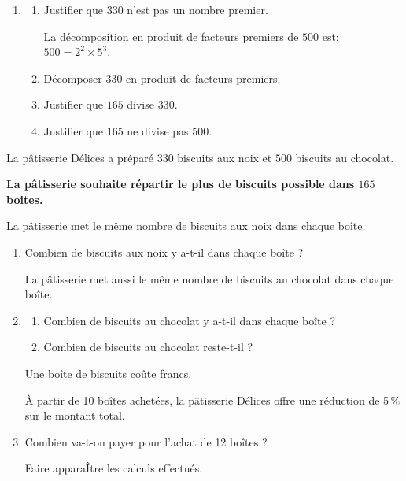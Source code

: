 
\medskip

\begin{enumerate}
\item 
	\begin{enumerate}
		\item Justifier que $330$ n'est pas un nombre premier.
		
La décomposition en produit de facteurs premiers de $500$ est: $500 = 2^2 \times 5^3$.
		\item Décomposer $330$ en produit de facteurs premiers.
		\item Justifier que $165$ divise $330$.
		\item Justifier que 165 ne divise pas $500$.
	\end{enumerate}
\end{enumerate}
	
La pâtisserie Délices a préparé $330$ biscuits aux noix et $500$ biscuits au chocolat.

\textbf{La pâtisserie souhaite répartir le plus de biscuits possible dans $165$ boites.}

La pâtisserie met le même nombre de biscuits aux noix dans chaque boîte.

\begin{enumerate}[resume]
\item Combien de biscuits aux noix y a-t-il dans chaque boîte ?

La pâtisserie met aussi le même nombre de biscuits au chocolat dans chaque boîte.
\item
	\begin{enumerate}
		\item Combien de biscuits au chocolat y a-t-il dans chaque boîte ?
		\item Combien de biscuits au chocolat reste-t-il ?
	\end{enumerate}
		
Une boîte de biscuits coûte  francs.

À partir de 10 boîtes achetées, la pâtisserie Délices offre une réduction de 5\,\% sur le montant total.
\item Combien va-t-on payer pour l'achat de 12 boîtes ?

Faire apparaÎtre les calculs effectués.

\end{enumerate}

\bigskip

